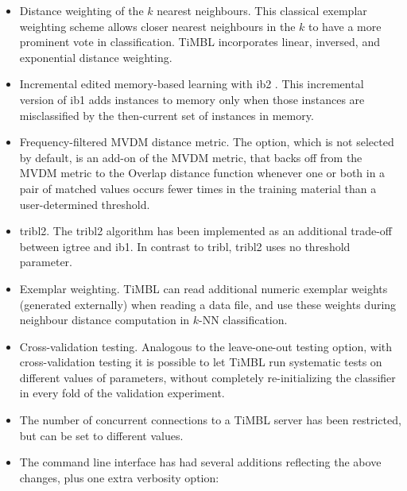 \documentclass{report}
\begin{document}
\begin{itemize}

\item Distance weighting of the $k$ nearest neighbours. This classical
exemplar weighting scheme \cite{Dudani76} allows closer nearest
neighbours in the $k$ to have a more prominent vote in
classification. TiMBL incorporates linear, inversed, and exponential
distance weighting.

\item Incremental edited memory-based learning with {\sc ib2}
\cite{Aha+91}. This incremental version of {\sc ib1} adds instances to
memory only when those instances are misclassified by the then-current
set of instances in memory.

\item Frequency-filtered MVDM distance metric. The option, which is
not selected by default, is an add-on of the MVDM metric, that backs
off from the MVDM metric to the Overlap distance function whenever one
or both in a pair of matched values occurs fewer times in the training
material than a user-determined threshold.

\item {\sc tribl2}. The {\sc tribl2} algorithm has been implemented
as an additional trade-off between {\sc igtree} and {\sc ib1}. In
contrast to {\sc tribl}, {\sc tribl2} uses no threshold parameter.

\item Exemplar weighting. TiMBL can read additional numeric exemplar
weights (generated externally) when reading a data file, and use these
weights during neighbour distance computation in $k$-NN classification.

\item Cross-validation testing. Analogous to the leave-one-out testing
option, with cross-validation testing it is possible to let TiMBL run
systematic tests on different values of parameters, without completely
re-initializing the classifier in every fold of the validation experiment.

\item The number of concurrent connections to a TiMBL server has been
restricted, but can be set to different values.

\item The command line interface has had several additions reflecting
the above changes, plus one extra verbosity option:


\end{itemize}
\end{document}
